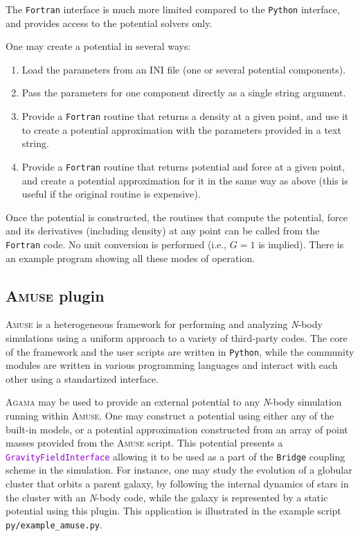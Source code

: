\documentclass[12pt]{article}
\newcommand{\Agama}{\textsc{Agama}\xspace}
\newcommand{\Amuse}{\textsc{Amuse}\xspace}
\newcommand{\Nbody}{\textsl{N}-body\xspace}
\newcommand{\Python}{\texttt{Python}\xspace}
\newcommand{\Fortran}{\texttt{Fortran}\xspace}
\newcommand{\ttt}[1]{\textcolor{darkviolet}{\texttt{#1}}}
\begin{document}
The \Fortran interface is much more limited compared to the \Python interface, and provides access to the potential solvers only. 

One may create a potential in several ways:
\begin{enumerate}  \setlength{\parskip}{2pt} \setlength{\itemsep}{2pt}
\item Load the parameters from an INI file (one or several potential components).
\item Pass the parameters for one component directly as a single string argument.
\item Provide a \Fortran routine that returns a density at a given point, and use it to create a potential approximation with the parameters provided in a text string.
\item Provide a \Fortran routine that returns potential and force at a given point, and create a potential approximation for it in the same way as above (this is useful if the original routine is expensive).
\end{enumerate}
Once the potential is constructed, the routines that compute the potential, force and its derivatives (including density) at any point can be called from the \Fortran code. No unit conversion is performed (i.e., $G=1$ is implied).
There is an example program showing all these modes of operation.


\subsection{\Amuse plugin}  \label{sec:Amuse}

\Amuse \cite{PortegiesZwart2013} is a heterogeneous framework for performing and analyzing \Nbody simulations using a uniform approach to a variety of third-party codes. The core of the framework and the user scripts are written in \Python, while the community modules are written in various programming languages and interact with each other using a standartized interface.

\Agama may be used to provide an external potential to any \Nbody simulation running within \Amuse. One may construct a potential using either any of the built-in models, or a potential approximation constructed from an array of point masses provided from the \Amuse script. This potential presents a \ttt{GravityFieldInterface} allowing it to be used as a part of the \texttt{Bridge} coupling scheme in the simulation. For instance, one may study the evolution of a globular cluster that orbits a parent galaxy, by following the internal dynamics of stars in the cluster with an \Nbody code, while the galaxy is represented by a static potential using this plugin. This application is illustrated in the example script \texttt{py/example_amuse.py}.
\end{document}
